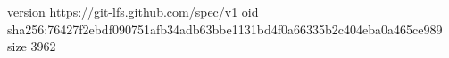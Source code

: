 version https://git-lfs.github.com/spec/v1
oid sha256:76427f2ebdf090751afb34adb63bbe1131bd4f0a66335b2c404eba0a465ce989
size 3962
